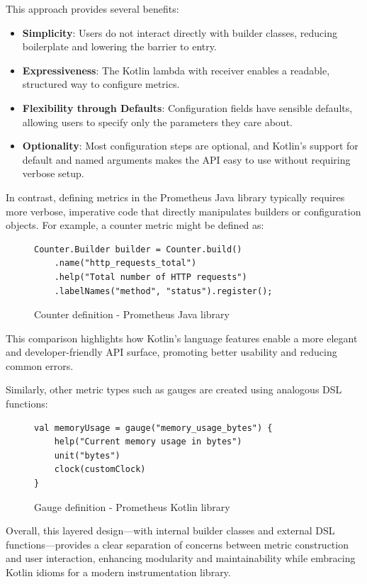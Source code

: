 This approach provides several benefits:

\begin{itemize}
    \item \textbf{Simplicity}: Users do not interact directly with builder classes, reducing boilerplate and lowering the barrier to entry.
    \item \textbf{Expressiveness}: The Kotlin lambda with receiver enables a readable, structured way to configure metrics.
    \item \textbf{Flexibility through Defaults}: Configuration fields have sensible defaults, allowing users to specify only the parameters they care about.
    \item \textbf{Optionality}: Most configuration steps are optional, and Kotlin’s support for default and named
    arguments makes the \ac{API} easy to use without requiring verbose setup.
\end{itemize}

In contrast, defining metrics in the Prometheus Java library typically requires more verbose, imperative code that
directly manipulates
builders or configuration objects.
For example, a counter metric might be defined as:


\begin{figure}[h]
    \begin{lstlisting}
Counter.Builder builder = Counter.build()
    .name("http_requests_total")
    .help("Total number of HTTP requests")
    .labelNames("method", "status").register();
    \end{lstlisting}
    \caption{Counter definition - Prometheus Java library}
\end{figure}

This comparison highlights how Kotlin’s language features enable a more elegant and developer-friendly \ac{API}
surface, promoting better usability and reducing common errors.

Similarly, other metric types such as gauges are created using analogous \ac{DSL} functions:

\begin{figure}[h]
    \begin{lstlisting}
val memoryUsage = gauge("memory_usage_bytes") {
    help("Current memory usage in bytes")
    unit("bytes")
    clock(customClock)
}
    \end{lstlisting}
    \caption{Gauge definition - Prometheus Kotlin library}
\end{figure}

Overall, this layered design—with internal builder classes and external \ac{DSL} functions—provides a clear separation
of concerns between metric construction and user interaction, enhancing modularity and maintainability while embracing Kotlin idioms for a modern instrumentation library.



